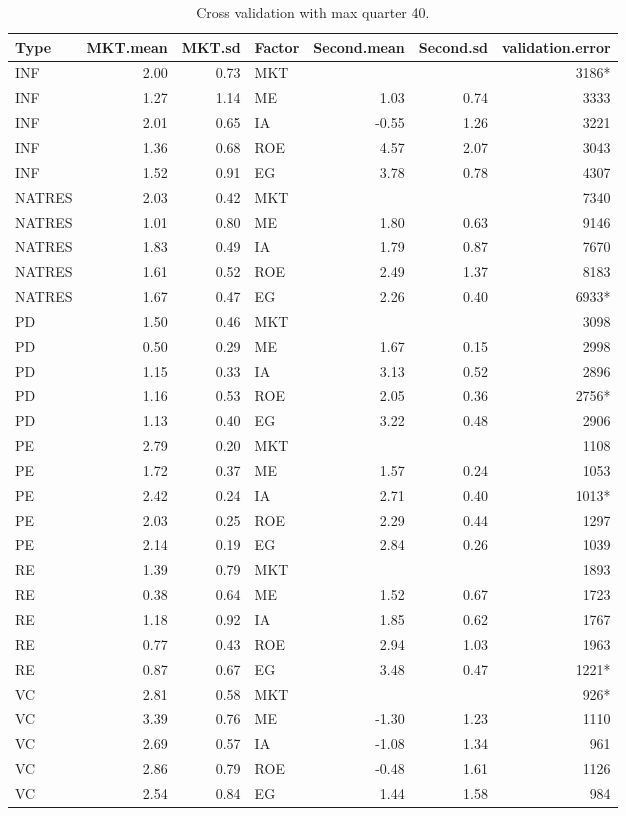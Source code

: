 \documentclass[12pt]{article}
\begin{document}
\begin{table}[ht]
	\centering
	\begin{tabular}{lrrlrrr}
		Type & MKT.mean & MKT.sd & Factor & Second.mean & Second.sd & validation.error \\ 
		\hline
		\hline
		INF & 2.00 & 0.73 & MKT &  &  & 3186* \\ 
		INF & 1.27 & 1.14 & ME & 1.03 & 0.74 & 3333 \\ 
		INF & 2.01 & 0.65 & IA & -0.55 & 1.26 & 3221 \\ 
		INF & 1.36 & 0.68 & ROE & 4.57 & 2.07 & 3043 \\ 
		INF & 1.52 & 0.91 & EG & 3.78 & 0.78 & 4307 \\ 
		\hline
		NATRES & 2.03 & 0.42 & MKT &  &  & 7340 \\ 
		NATRES & 1.01 & 0.80 & ME & 1.80 & 0.63 & 9146 \\ 
		NATRES & 1.83 & 0.49 & IA & 1.79 & 0.87 & 7670 \\ 
		NATRES & 1.61 & 0.52 & ROE & 2.49 & 1.37 & 8183 \\ 
		NATRES & 1.67 & 0.47 & EG & 2.26 & 0.40 & 6933* \\ 
		\hline
		PD & 1.50 & 0.46 & MKT &  &  & 3098 \\ 
		PD & 0.50 & 0.29 & ME & 1.67 & 0.15 & 2998 \\ 
		PD & 1.15 & 0.33 & IA & 3.13 & 0.52 & 2896 \\ 
		PD & 1.16 & 0.53 & ROE & 2.05 & 0.36 & 2756* \\ 
		PD & 1.13 & 0.40 & EG & 3.22 & 0.48 & 2906 \\ 
		\hline
		PE & 2.79 & 0.20 & MKT &  &  & 1108 \\ 
		PE & 1.72 & 0.37 & ME & 1.57 & 0.24 & 1053 \\ 
		PE & 2.42 & 0.24 & IA & 2.71 & 0.40 & 1013* \\ 
		PE & 2.03 & 0.25 & ROE & 2.29 & 0.44 & 1297 \\ 
		PE & 2.14 & 0.19 & EG & 2.84 & 0.26 & 1039 \\ 
		\hline
		RE & 1.39 & 0.79 & MKT &  &  & 1893 \\ 
		RE & 0.38 & 0.64 & ME & 1.52 & 0.67 & 1723 \\ 
		RE & 1.18 & 0.92 & IA & 1.85 & 0.62 & 1767 \\ 
		RE & 0.77 & 0.43 & ROE & 2.94 & 1.03 & 1963 \\ 
		RE & 0.87 & 0.67 & EG & 3.48 & 0.47 & 1221* \\ 
		\hline
		VC & 2.81 & 0.58 & MKT &  &  & 926* \\ 
		VC & 3.39 & 0.76 & ME & -1.30 & 1.23 & 1110 \\ 
		VC & 2.69 & 0.57 & IA & -1.08 & 1.34 & 961 \\ 
		VC & 2.86 & 0.79 & ROE & -0.48 & 1.61 & 1126 \\ 
		VC & 2.54 & 0.84 & EG & 1.44 & 1.58 & 984 \\ 
		\hline
		\hline
	\end{tabular}
	\caption{Cross validation with max quarter 40.} 
\end{table}
\end{document}
